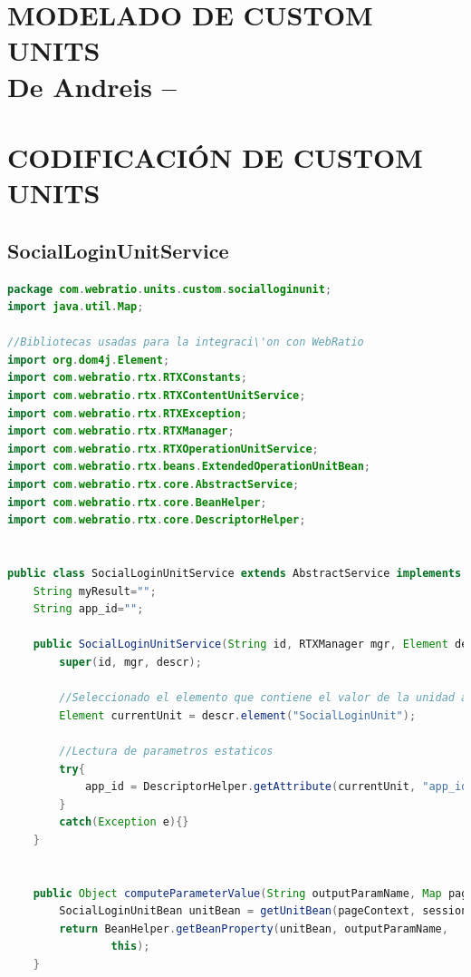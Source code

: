 \documentclass[oneside,12pt,a4paper]{memoir}%
\begin{document}
\chapter{MODELADO DE CUSTOM UNITS\\De Andreis -- \cite{Andreis2010}}
\label{ane:customUnits}
	



\chapter{CODIFICACI\'ON DE CUSTOM UNITS}
\label{ane:srcCustomUnits}
\section{SocialLoginUnitService}
\begin{landscape}
\begin{lstlisting}[language=java, style=eclipse]  
package com.webratio.units.custom.socialloginunit;
import java.util.Map;

//Bibliotecas usadas para la integraci\'on con WebRatio
import org.dom4j.Element;
import com.webratio.rtx.RTXConstants;
import com.webratio.rtx.RTXContentUnitService;
import com.webratio.rtx.RTXException;
import com.webratio.rtx.RTXManager;
import com.webratio.rtx.RTXOperationUnitService;
import com.webratio.rtx.beans.ExtendedOperationUnitBean;
import com.webratio.rtx.core.AbstractService;
import com.webratio.rtx.core.BeanHelper;
import com.webratio.rtx.core.DescriptorHelper;


public class SocialLoginUnitService extends AbstractService implements RTXContentUnitService, RTXOperationUnitService{
	String myResult="";
	String app_id="";
	
	public SocialLoginUnitService(String id, RTXManager mgr, Element descr) {
		super(id, mgr, descr);
		
		//Seleccionado el elemento que contiene el valor de la unidad actual
		Element currentUnit = descr.element("SocialLoginUnit");
		
		//Lectura de parametros estaticos
		try{
			app_id = DescriptorHelper.getAttribute(currentUnit, "app_id", true, this).toString();
		}
		catch(Exception e){}
	}
	

    public Object computeParameterValue(String outputParamName, Map pageContext, Map sessionContext) throws RTXException {
		SocialLoginUnitBean unitBean = getUnitBean(pageContext, sessionContext);
		return BeanHelper.getBeanProperty(unitBean, outputParamName,
				this);
    }


\end{lstlisting}
\end{landscape}
\end{document}

